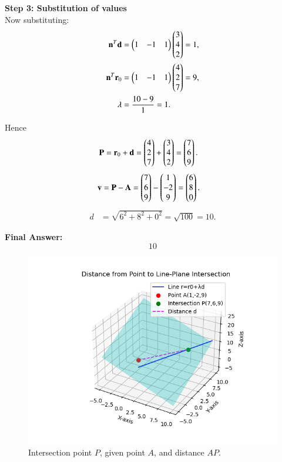 \documentclass[journal]{IEEEtran}
\begin{document}
\textbf{Step 3: Substitution of values} \\
Now substituting:
\begin{align}
    \mathbf{n}^T\mathbf{d} &= \begin{pmatrix}1 & -1 & 1\end{pmatrix}\begin{pmatrix}3 \\ 4 \\ 2\end{pmatrix} = 1, \\
    \mathbf{n}^T\mathbf{r}_0 &= \begin{pmatrix}1 & -1 & 1\end{pmatrix}\begin{pmatrix}4 \\ 2 \\ 7\end{pmatrix} = 9, \\
    \lambda &= \frac{10-9}{1} = 1.
\end{align}

Hence
\begin{align}
    \mathbf{P} &= \mathbf{r}_0 + \mathbf{d} = \begin{pmatrix}4 \\ 2 \\ 7\end{pmatrix} + \begin{pmatrix}3 \\ 4 \\ 2\end{pmatrix} = \begin{pmatrix}7 \\ 6 \\ 9\end{pmatrix}.
\end{align}
\begin{align}
    \mathbf{v} &= \mathbf{P} - \mathbf{A} = \begin{pmatrix}7 \\ 6 \\ 9\end{pmatrix} - \begin{pmatrix}1 \\ -2 \\ 9\end{pmatrix} = \begin{pmatrix}6 \\ 8 \\ 0\end{pmatrix}.
\end{align}
\begin{align}
    d &= \sqrt{6^2+8^2+0^2} = \sqrt{100} = 10.
\end{align}

\textbf{Final Answer: } 
\[
\boxed{10}
\]

\pagebreak
\begin{figure}[H]
    \centering
    \includegraphics[width=0.7\columnwidth]{figs/Figure_1.png}
    \caption{Intersection point $P$, given point $A$, and distance $AP$.}
    \label{fig:fig1}
\end{figure}
\end{document}
